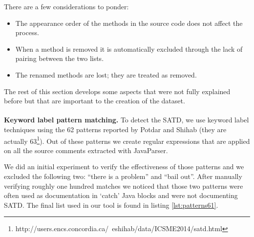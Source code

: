 There are a few considerations to ponder: 

\begin{itemize}
    \item The appearance order of the methods in the source code does not affect the process.
    \item When a method is removed it is automatically excluded through the lack of pairing between the two lists.
    \item The renamed methods are lost; they are treated as removed.
\end{itemize}

\noindent The rest of this section develops some aspects that were not fully explained before but that are important to the creation of the dataset.
\\
\\
\textbf{Keyword label pattern matching.} 
To detect the SATD, we use keyword label techniques using the 62 patterns reported by Potdar and Shihab \cite{potdar2014exploratory} (they are actually 63\footnote{http://users.encs.concordia.ca/~eshihab/data/ICSME2014/satd.html}). Out of these patterns we create regular expressions that are applied on all the source comments extracted with JavaParser.

We did an initial experiment to verify the effectiveness of those patterns and we excluded the following two: ``there is a problem'' and ``bail out''. After manually verifying roughly one hundred matches we noticed that those two patterns were often used as documentation in `catch' Java blocks and were not documenting SATD. The final list used in our tool is found in listing \ref{lst:patterns61}.


